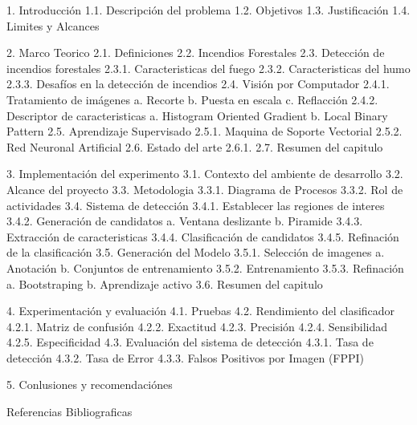 1. Introducción
    1.1. Descripción del problema
    1.2. Objetivos
    1.3. Justificación
    1.4. Limites y Alcances

2. Marco Teorico
    2.1. Definiciones
    2.2. Incendios Forestales
    2.3. Detección de incendios forestales
        2.3.1. Caracteristicas del fuego
        2.3.2. Caracteristicas del humo
        2.3.3. Desafíos en la detección de incendios
    2.4. Visión por Computador
        2.4.1. Tratamiento de imágenes
            a. Recorte
            b. Puesta en escala
            c. Reflacción
        2.4.2. Descriptor de caracteristicas
            a. Histogram Oriented Gradient
            b. Local Binary Pattern
    2.5. Aprendizaje Supervisado
        2.5.1. Maquina de Soporte Vectorial
        2.5.2. Red Neuronal Artificial
    2.6. Estado del arte
        2.6.1. 
    2.7. Resumen del capitulo

3. Implementación del experimento
    3.1. Contexto del ambiente de desarrollo
    3.2. Alcance del proyecto
    3.3. Metodologia
        3.3.1. Diagrama de Procesos
        3.3.2. Rol de actividades
    3.4. Sistema de detección
        3.4.1. Establecer las regiones de interes
        3.4.2. Generación de candidatos
            a. Ventana deslizante
            b. Piramide
        3.4.3. Extracción de caracteristicas
        3.4.4. Clasificación de candidatos
        3.4.5. Refinación de la clasificación
    3.5. Generación del Modelo
        3.5.1. Selección de imagenes
            a. Anotación
            b. Conjuntos de entrenamiento
        3.5.2. Entrenamiento
        3.5.3. Refinación
            a. Bootstraping
            b. Aprendizaje activo
    3.6. Resumen del capitulo

4. Experimentación y evaluación
    4.1. Pruebas
    4.2. Rendimiento del clasificador
        4.2.1. Matriz de confusión
        4.2.2. Exactitud
        4.2.3. Precisión
        4.2.4. Sensibilidad
        4.2.5. Especificidad
    4.3. Evaluación del sistema de detección
        4.3.1. Tasa de detección
        4.3.2. Tasa de Error
        4.3.3. Falsos Positivos por Imagen (FPPI)

5. Conlusiones y recomendaciónes

Referencias Bibliograficas
